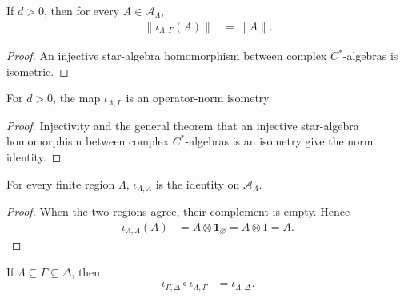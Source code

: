 \begin{lemma}
    \label{lem:qca_local_inclusion_norm}
    \leanok
    If $d>0$, then for every $A\in\mathcal A_\Lambda$,
    \begin{align}
        \lVert\iota_{\Lambda,\Gamma}(A)\rVert & =\lVert A\rVert.
    \end{align}
\end{lemma}

\begin{proof}\leanok
    An injective star-algebra homomorphism between complex $C^*$-algebras is
    isometric.
\end{proof}

\begin{lemma}
    \label{lem:qca_local_inclusion_isometry}
    \leanok
    For $d>0$, the map $\iota_{\Lambda,\Gamma}$ is an operator-norm isometry.
\end{lemma}

\begin{proof}\leanok
    Injectivity and the general theorem that an injective star-algebra
    homomorphism between complex $C^*$-algebras is an isometry give the norm identity.
\end{proof}

\begin{lemma}
    \label{lem:qca_local_inclusion_refl}
    \leanok
    For every finite region $\Lambda$,
    $\iota_{\Lambda,\Lambda}$ is the identity on $\mathcal A_\Lambda$.
\end{lemma}

\begin{proof}\leanok
    When the two regions agree, their complement is empty.  Hence
    \begin{align}
        \iota_{\Lambda,\Lambda}(A)
         & =A\otimes\mathbf 1_{\varnothing}
        =A\otimes 1
        =A.
    \end{align}
\end{proof}

\begin{lemma}
    \label{lem:qca_local_inclusion_trans}
    \leanok
    If $\Lambda\subseteq\Gamma\subseteq\Delta$, then
    \begin{align}
        \iota_{\Gamma,\Delta}\circ\iota_{\Lambda,\Gamma}
         & =\iota_{\Lambda,\Delta}.
    \end{align}
\end{lemma}

